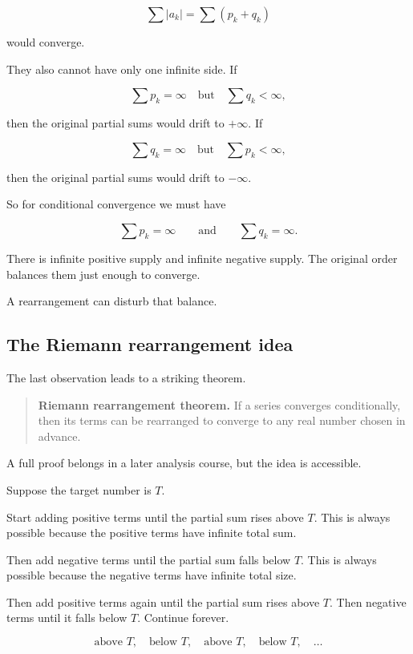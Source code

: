 \[
\sum |a_k|=\sum(p_k+q_k)
\]

would converge.

They also cannot have only one infinite side.  If

\[
\sum p_k=\infty
\quad\text{but}\quad
\sum q_k<\infty,
\]

then the original partial sums would drift to \(+\infty\).  If

\[
\sum q_k=\infty
\quad\text{but}\quad
\sum p_k<\infty,
\]

then the original partial sums would drift to \(-\infty\).

So for conditional convergence we must have

\[
\sum p_k=\infty
\qquad\text{and}\qquad
\sum q_k=\infty.
\]

There is infinite positive supply and infinite negative supply.  The original order
balances them just enough to converge.

A rearrangement can disturb that balance.

\subsection{The Riemann rearrangement idea}
\label{subsec:riemann-rearrangement-idea}

The last observation leads to a striking theorem.

\begin{quote}
\textbf{Riemann rearrangement theorem.}
If a series converges conditionally, then its terms can be rearranged to converge to any
real number chosen in advance.
\end{quote}

A full proof belongs in a later analysis course, but the idea is accessible.

Suppose the target number is \(T\).

Start adding positive terms until the partial sum rises above \(T\).  This is always
possible because the positive terms have infinite total sum.

Then add negative terms until the partial sum falls below \(T\).  This is always possible
because the negative terms have infinite total size.

Then add positive terms again until the partial sum rises above \(T\).  Then negative
terms until it falls below \(T\).  Continue forever.

\[
\text{above }T,
\quad
\text{below }T,
\quad
\text{above }T,
\quad
\text{below }T,
\quad\ldots
\]

